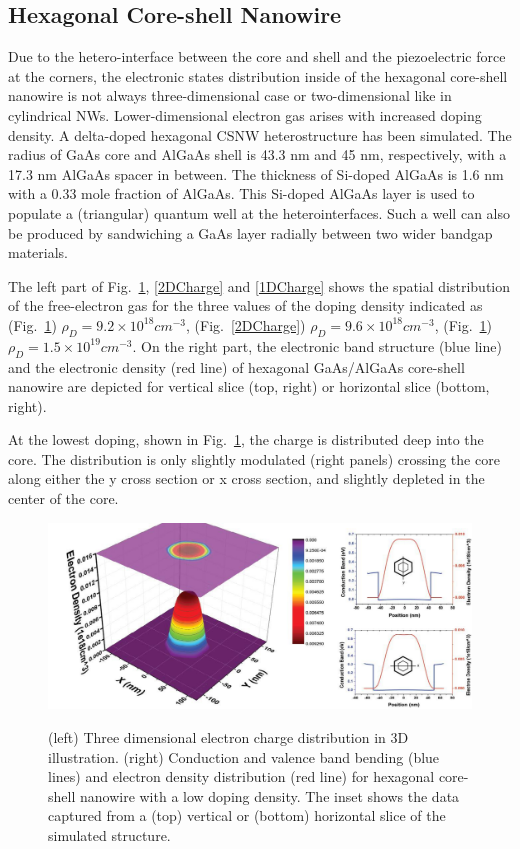 \subsection{Hexagonal Core-shell Nanowire} \label{sec:indv_lines}

Due to the hetero-interface between the core and shell and the piezoelectric
force at the corners, the electronic states distribution inside of the
hexagonal core-shell nanowire is not always three-dimensional case or
two-dimensional like in cylindrical NWs. Lower-dimensional electron gas arises
with increased doping density. A delta-doped hexagonal CSNW heterostructure has
been simulated. The radius of GaAs core and AlGaAs shell is 43.3 nm and 45 nm,
respectively, with a 17.3 nm AlGaAs spacer in between. The thickness of
Si-doped AlGaAs is 1.6 nm with a 0.33 mole fraction of AlGaAs. This Si-doped
AlGaAs layer is used to populate a (triangular) quantum well at the
heterointerfaces. Such a well can also be produced by sandwiching a GaAs layer
radially between two wider bandgap materials. 

The left part of Fig.~\ref{3DCharge}, \ref{2DCharge} and \ref{1DCharge} shows
the spatial distribution of the free-electron gas for the three values of the
doping density indicated as (Fig.~\ref{3DCharge}) $\rho_D = 9.2 \times 10^{18}
cm^{-3}$, (Fig.~\ref{2DCharge}) $\rho_D = 9.6 \times 10^{18} cm^{-3}$,
(Fig.~\ref{3DCharge}) $\rho_D = 1.5 \times 10^{19} cm^{-3}$. On the right part,
the electronic band structure (blue line) and the electronic density (red line)
of hexagonal GaAs/AlGaAs core-shell nanowire are depicted for vertical slice
(top, right) or horizontal slice (bottom, right).

At the lowest doping, shown in Fig.~\ref{3DCharge}, the charge is distributed
deep into the core. The distribution is only slightly modulated (right panels)
crossing the core along either the y cross section or x cross section, and
slightly depleted in the center of the core.

\begin{figure}
  \caption{(left) Three dimensional electron charge distribution in 3D illustration. (right) Conduction and valence band bending (blue lines) and electron density distribution (red line) for hexagonal core-shell nanowire with a low doping density. The inset shows the data captured from a (top) vertical or (bottom) horizontal slice of the simulated structure.}
  \centering
  \includegraphics[width=\textwidth]{pictures/ED/3DCharge}
  \label{3DCharge}
\end{figure}

